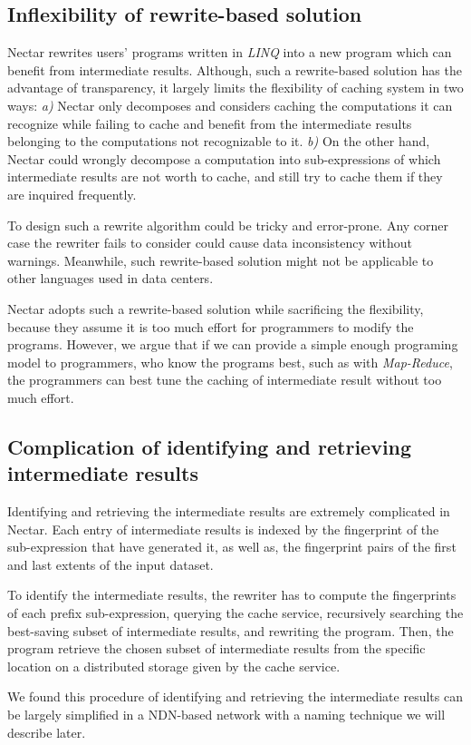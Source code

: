 \subsection{Inflexibility of rewrite-based solution} Nectar rewrites users'
programs written in \emph{LINQ} into a new program which can benefit from
intermediate results. Although, such a rewrite-based solution has the advantage
of transparency, it largely limits the flexibility of caching system in two
ways: \emph{a)} Nectar only decomposes and considers caching the computations
it can recognize while failing to cache and benefit from the intermediate
results belonging to the computations not recognizable to it.  \emph{b)} On the
other hand, Nectar could wrongly decompose a computation into sub-expressions
of which intermediate results are not worth to cache, and still try to cache
them if they are inquired frequently.

To design such a rewrite algorithm could be tricky and error-prone. Any corner
case the rewriter fails to consider could cause data inconsistency without
warnings. Meanwhile, such rewrite-based solution might not be applicable to
other languages used in data centers.

Nectar adopts such a rewrite-based solution while sacrificing the flexibility,
because they assume it is too much effort for programmers to modify the
programs. However, we argue that if we can provide a simple enough programing
model to programmers, who know the programs best, such as with
\emph{Map-Reduce}, the programmers can best tune the caching of intermediate
result without too much effort.

\subsection{Complication of identifying and retrieving intermediate results}
Identifying and retrieving the intermediate results are extremely complicated
in Nectar.  Each entry of intermediate results is indexed by the fingerprint of
the sub-expression that have generated it, as well as, the fingerprint pairs of
the first and last extents of the input dataset. 

To identify the intermediate results, the rewriter has to compute the
fingerprints of each prefix sub-expression, querying the cache service,
recursively searching the best-saving subset of intermediate results, and
rewriting the program. Then, the program retrieve the chosen subset of
intermediate results from the specific location on a distributed storage given
by the cache service.

We found this procedure of identifying and retrieving the intermediate results
can be largely simplified in a NDN-based network with a naming technique we
will describe later.
